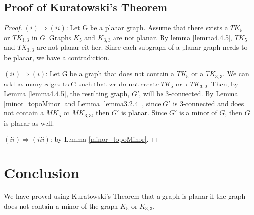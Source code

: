 \subsection{Proof of Kuratowski's Theorem}

\begin{proof}
$(i) \Rightarrow (ii)$: Let G be a planar graph. Assume that there exists a $TK_5$ or $TK_{3,3}$ in $G$. Graphs $K_5$ and $K_{3,3}$ are not planar. By lemma \ref{lemma4.4.5}, $TK_5$ and $TK_{3,3}$ are not planar eit her. Since each subgraph of a planar graph needs to be planar, we have a contradiction.

$(ii) \Rightarrow (i)$: Let G be a graph that does not contain a $TK_5$ or a $TK_{3,3}$. We can add as many edges to G such that we do not create $TK_5$ or a $TK_{3,3}$. Then, by Lemma \ref{lemma4.4.5}, the resulting graph, $G'$, will be 3-connected. By Lemma \ref{minor_topoMinor} and Lemma \ref{lemma3.2.4} , since $G'$ is 3-connected and does not contain a $MK_5$ or $MK_{3,3}$, then $G'$ is planar. Since $G'$ is a minor of $G$, then $G$ is planar as well.

$(ii) \Rightarrow (iii)$: by Lemma \ref{minor_topoMinor}.

\end{proof}


\section{Conclusion}
We have proved using Kuratowski's Theorem that a graph is planar if the graph does not contain a minor of the graph $K_5$ or $K_{3,3}$.






